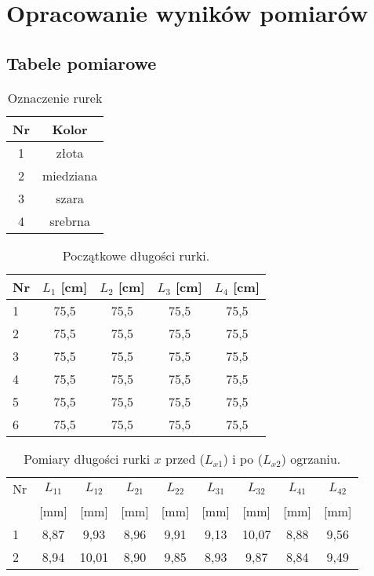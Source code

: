 \documentclass[a4paper,12pt]{article}
\begin{document}
\section{Opracowanie wyników pomiarów}

\subsection{Tabele pomiarowe}


\begin{table}[H]
    \centering
    \begin{tabular}{|c|c|}
        \hline
        \textbf{Nr} & \textbf{Kolor} \\
        \hline
        1 & złota \\
        \hline
        2 & miedziana \\
        \hline
        3 & szara \\
        \hline
        4 & srebrna \\
        \hline
    \end{tabular}
    \caption{Oznaczenie rurek}
\end{table}

\begin{table}[H]
    \centering
    \begin{tabular}{|l|c|c|c|c|}
        \hline
        Nr & $L_1$ [cm] & $L_2$ [cm] & $L_3$ [cm] & $L_4$ [cm] \\
        \hline
        1 & 75,5 & 75,5 & 75,5 & 75,5 \\
        2 & 75,5 & 75,5 & 75,5 & 75,5 \\
        3 & 75,5 & 75,5 & 75,5 & 75,5 \\
        4 & 75,5 & 75,5 & 75,5 & 75,5 \\
        5 & 75,5 & 75,5 & 75,5 & 75,5 \\
        6 & 75,5 & 75,5 & 75,5 & 75,5 \\
        \hline
    \end{tabular}
    \caption{Początkowe długości rurki.}
\end{table}

\begin{table}[H]
    \centering
    \begin{tabular}{|l|c|c||c|c||c|c||c|c|}
        \hline
        Nr & $L_{11}$ & $L_{12}$ & $L_{21}$ & $L_{22}$ & $L_{31}$ & $L_{32}$ & $L_{41}$ & $L_{42}$ \\
        & [mm] & [mm] & [mm] & [mm] & [mm] & [mm] & [mm] & [mm] \\
        \hline
        1 & 8,87 & 9,93 & 8,96 & 9,91 & 9,13 & 10,07 & 8,88 & 9,56 \\
        2 & 8,94 & 10,01 & 8,90 & 9,85 & 8,93 & 9,87 & 8,84 & 9,49 \\
        \hline
    \end{tabular}
    \caption{Pomiary długości rurki $x$ przed ($L_{x1}$) i po ($L_{x2}$) ogrzaniu.}
\end{table}
\end{document}
